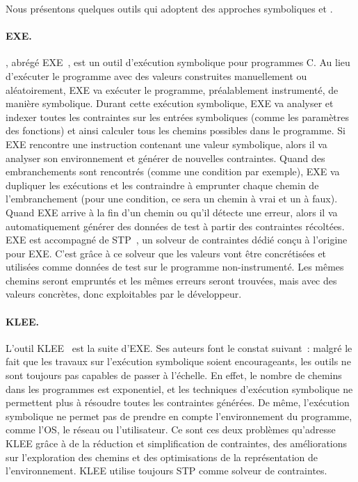 Nous présentons quelques outils qui adoptent des approches symboliques et
.

\paragraph{EXE.} , abrégé
EXE~, est un outil d'exécution symbolique pour
programmes C. Au lieu d'exécuter le programme avec des valeurs construites
manuellement ou aléatoirement, EXE va exécuter le programme, préalablement
instrumenté, de manière symbolique. Durant cette exécution symbolique, EXE va
analyser et indexer toutes les contraintes sur les entrées symboliques (comme
les paramètres des fonctions) et ainsi calculer tous les chemins possibles dans
le programme.  Si EXE rencontre une instruction contenant une valeur symbolique,
alors il va analyser son environnement et générer de nouvelles contraintes.
Quand des embranchements sont rencontrés (comme une condition par exemple), EXE
va dupliquer les exécutions et les contraindre à emprunter chaque chemin de
l'embranchement (pour une condition, ce sera un chemin à vrai et un à faux).
Quand EXE arrive à la fin d'un chemin ou qu'il détecte une erreur, alors il va
automatiquement générer des données de test à partir des contraintes récoltées.
EXE est accompagné de STP~, un solveur de contraintes dédié
conçu à l'origine pour EXE. C'est grâce à ce solveur que les valeurs vont être
concrétisées et utilisées comme données de test sur le programme
non-instrumenté. Les mêmes chemins seront empruntés et les mêmes erreurs seront
trouvées, mais avec des valeurs concrètes, donc exploitables par le développeur.

\paragraph{KLEE.} L'outil KLEE~ est la suite d'EXE. Ses auteurs
font le constat suivant~: malgré le fait que les travaux sur l'exécution
symbolique soient encourageants, les outils ne sont toujours pas capables de
passer à l'échelle. En effet, le nombre de chemins dans les programmes est
exponentiel, et les techniques d'exécution symbolique ne permettent plus à
résoudre toutes les contraintes générées. De même, l'exécution symbolique ne
permet pas de prendre en compte l'environnement du programme, comme l'OS, le
réseau ou l'utilisateur. Ce sont ces deux problèmes qu'adresse KLEE grâce à de
la réduction et simplification de contraintes, des améliorations sur
l'exploration des chemins et des optimisations de la représentation de
l'environnement. KLEE utilise toujours STP comme solveur de contraintes.

